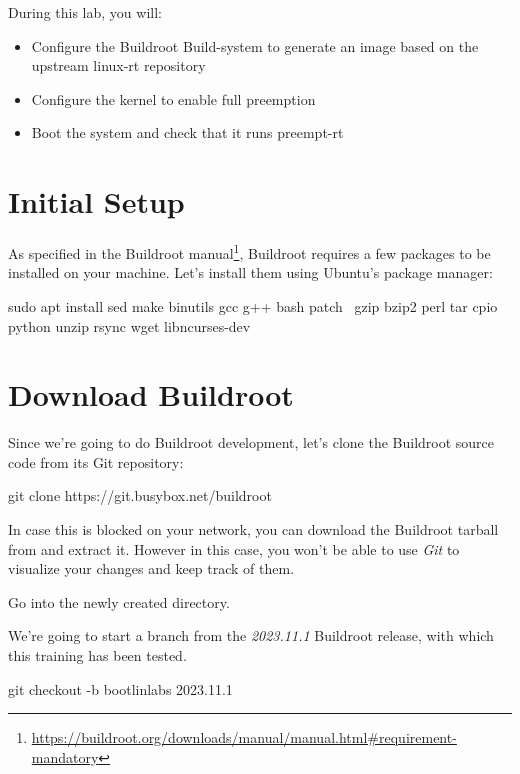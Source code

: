 
During this lab, you will:
\begin{itemize}
	\item Configure the Buildroot Build-system to generate an image based on the upstream linux-rt repository
	\item Configure the kernel to enable full preemption
	\item Boot the system and check that it runs preempt-rt
\end{itemize}

\section{Initial Setup}
As specified in the Buildroot
manual\footnote{\url{https://buildroot.org/downloads/manual/manual.html\#requirement-mandatory}},
Buildroot requires a few packages to be installed on your
machine. Let's install them using Ubuntu's package manager:

\begin{bashinput}
sudo apt install sed make binutils gcc g++ bash patch \
  gzip bzip2 perl tar cpio python unzip rsync wget libncurses-dev
\end{bashinput}

\section{Download Buildroot}

Since we're going to do Buildroot development, let's clone the
Buildroot source code from its Git repository:

\begin{bashinput}
git clone https://git.busybox.net/buildroot
\end{bashinput}

In case this is blocked on your network, you can download the Buildroot
tarball \code{buildroot-2023.11.1.tar.bz2} from
 and extract it. However in this
case, you won't be able to use {\em Git} to visualize your changes and
keep track of them.

Go into the newly created  directory.

We're going to start a branch from the {\em 2023.11.1} Buildroot
release, with which this training has been tested.

\begin{bashinput}
git checkout -b bootlinlabs 2023.11.1
\end{bashinput}

